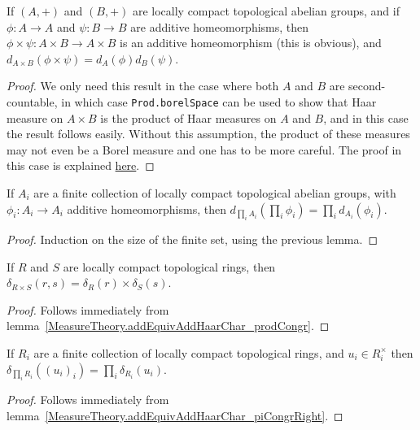 \begin{lemma}
  \label{MeasureTheory.addEquivAddHaarChar_prodCongr}
  \leanok
  If $(A,+)$ and $(B,+)$ are locally compact topological abelian groups,
  and if $\phi:A\to A$ and $\psi:B\to B$ are additive homeomorphisms,
  then $\phi\times\psi:A\times B\to A\times B$ is an additive homeomorphism (this is
  obvious), and
  $d_{A\times B}(\phi\times\psi)=d_A(\phi)d_B(\psi)$.
\end{lemma}
\begin{proof}
  We only need this result in the case where both $A$ and $B$ are second-countable, in which case
  {\tt Prod.borelSpace} can be used to show that Haar measure on $A\times B$ is the product of
  Haar measures on $A$ and $B$, and in this case the result follows easily. Without this assumption,
  the product of these measures may not even be a Borel measure and one has to be more careful.
  The proof in this case is explained \href{https://leanprover.zulipchat.com/#narrow/channel/116395-maths/topic/Product.20of.20Borel.20spaces/near/487257981}{here}.
\end{proof}

\begin{lemma}
  \label{MeasureTheory.mulEquivHaarChar_piCongrRight}
  \leanok
  If $A_i$ are a finite collection of locally compact topological abelian groups,
  with $\phi_i:A_i\to A_i$ additive homeomorphisms, then $d_{\prod_i A_i}(\prod_i\phi_i)=\prod_i d_{A_i}(\phi_i)$.
\end{lemma}
\begin{proof}
  Induction on the size of the finite set, using the previous lemma.
\end{proof}

\begin{lemma}
  \label{MeasureTheory.ringHaarChar_prod}
  \leanok
  If $R$ and $S$ are locally compact topological rings, then $\delta_{R\times S}(r,s)=\delta_R(r)\times\delta_S(s)$.
\end{lemma}
\begin{proof}
  \leanok
  Follows immediately from lemma~\ref{MeasureTheory.addEquivAddHaarChar_prodCongr}.
\end{proof}

\begin{lemma}
  \label{MeasureTheory.ringHaarChar_pi}
  \leanok
  If $R_i$ are a finite collection of locally compact topological rings,
  and $u_i\in R_i^\times$ then $\delta_{\prod_i R_i}((u_i)_i)=\prod_i\delta_{R_i}(u_i)$.
\end{lemma}
\begin{proof}
  \leanok
  Follows immediately from lemma~\ref{MeasureTheory.addEquivAddHaarChar_piCongrRight}.
\end{proof}

